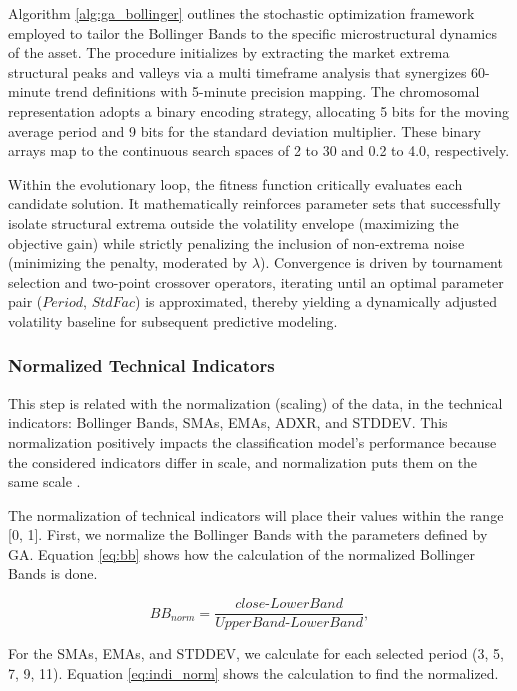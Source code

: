 \documentclass{ieeeaccess}
\begin{document}
Algorithm \ref{alg:ga_bollinger} outlines the stochastic optimization framework employed to tailor the Bollinger Bands to the specific microstructural dynamics of the asset. The procedure initializes by extracting the market extrema structural peaks and valleys via a multi timeframe analysis that synergizes 60-minute trend definitions with 5-minute precision mapping. The chromosomal representation adopts a binary encoding strategy, allocating 5 bits for the moving average period and 9 bits for the standard deviation multiplier. These binary arrays map to the continuous search spaces of 2 to 30 and 0.2 to 4.0, respectively. 

Within the evolutionary loop, the fitness function critically evaluates each candidate solution. It mathematically reinforces parameter sets that successfully isolate structural extrema outside the volatility envelope (maximizing the objective gain) while strictly penalizing the inclusion of non-extrema noise (minimizing the penalty, moderated by $\lambda$). Convergence is driven by tournament selection and two-point crossover operators, iterating until an optimal parameter pair ($Period$, $StdFac$) is approximated, thereby yielding a dynamically adjusted volatility baseline for subsequent predictive modeling.


\subsubsection{Normalized Technical Indicators}
\label{normalized_TI}
This step is related with the normalization (scaling) of the data, in the technical indicators: Bollinger Bands, SMAs, EMAs, ADXR, and STDDEV. This normalization positively impacts the classification model's performance because the considered indicators differ in scale, and normalization puts them on the same scale \cite{borkin2019impact}.

The normalization of technical indicators will place their values within the range [0, 1]. First, we normalize the Bollinger Bands with the parameters defined by GA. Equation \eqref{eq:bb} shows how the calculation of the normalized Bollinger Bands is done.

\begin{equation}
\mathit{BB_{\text{norm}}} = \frac{\mathit{close} \text{-} \mathit{LowerBand}}
{\mathit{UpperBand} \text{-} \mathit{LowerBand}},
\label{eq:bb}
\end{equation}

For the SMAs, EMAs, and STDDEV, we calculate for each selected period (3, 5, 7, 9, 11). Equation \eqref{eq:indi_norm} shows the calculation to find the normalized.
\end{document}

